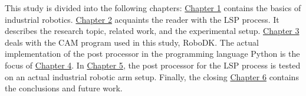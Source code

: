 This study is divided into the following chapters: \hyperref[chap:basics]{Chapter 1} contains the basics of industrial robotics. \hyperref[chap:peening]{Chapter 2} acquaints the reader with the LSP process.  It describes the research topic, related work, and the experimental setup.  
\hyperref[chap:design]{Chapter 3} deals with the CAM program used in this study, RoboDK. The actual implementation of the post processor in the programming language Python is the focus of \hyperref[chap:implementation]{Chapter 4}. In \hyperref[chap:testing]{Chapter 5}, the post processor for the LSP process is tested on an actual industrial robotic arm setup. Finally, the closing \hyperref[chap:discussion]{Chapter 6} contains the conclusions and future work. 